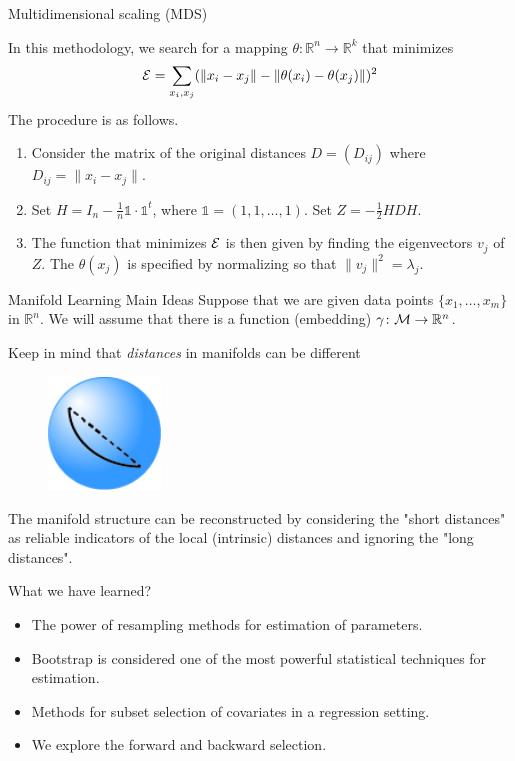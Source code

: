 \documentclass{beamer}
\begin{document}
\begin{frame}{Multidimensional scaling (MDS)}

In this methodology, we search for a mapping $\theta \colon \mathbb{R}^n \to \mathbb{R}^k$ that minimizes
\begin{equation*}
	{\cal E}= \sum_{x_i,x_j} ( \|x_i -x_j \| - \|\theta(x_i)-\theta(x_j)\|)^2
\end{equation*}
The procedure is as follows. 
\begin{enumerate}
	\item Consider the matrix of the original distances $D=(D_{ij})$ where $D_{ij}= \|x_i -x_j\|$. 
	\item Set $H= I_n - \frac{1}{n} \mathbb{1} \cdot \mathbb{1}^t$, where $\mathbb{1}= (1,1, \ldots, 1)$. Set $Z= -\frac{1}{2} H D H$.
	\item The function that minimizes $\cal E$ is then given by finding the eigenvectors $v_j$ of $Z$. The $\theta(x_j)$ is specified by normalizing so that $\|v_j\|^2=\lambda_j$.
\end{enumerate}
\end{frame}

\begin{frame}{Manifold Learning Main Ideas}
	Suppose that we are given data points $\{x_1, \ldots, x_m\}$ in $\mathbb{R}^n$. We will assume that there is a function (embedding) $\gamma \colon {\cal M} \to \mathbb{R}^n$. 
	
	Keep in mind that \textit{distances} in manifolds can be different
\begin{figure}[h]
	\centering
	\includegraphics[width=3cm]{../../Figures/fig_geodesic.jpg}
\end{figure}
	The manifold structure can be reconstructed by considering the "short distances" as reliable indicators of the local (intrinsic) distances and ignoring the "long distances".
	

\end{frame}

\begin{frame}{What we have learned?	}
	\begin{itemize}
		\item The power of resampling methods for estimation of parameters.
		\item Bootstrap is considered one of the most powerful statistical techniques for estimation. 
		\item Methods for subset selection of covariates in a regression setting.
		\item We explore the forward and backward selection.
	\end{itemize}
\end{frame}
\end{document}

